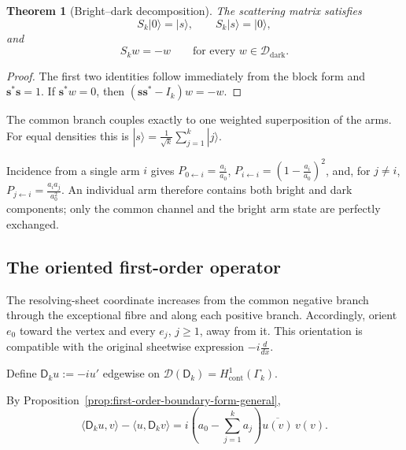 \documentclass[11pt]{article}
\theoremstyle{plain}
\newtheorem{theorem}{Theorem}[section]
\theoremstyle{definition}
\begin{document}
\begin{theorem}[Bright--dark decomposition]
\label{thm:Bk-bright-dark}
The scattering matrix satisfies
\[
  S_k|0\rangle=|s\rangle,
  \qquad
  S_k|s\rangle=|0\rangle,
\]
and
\[
  S_kw=-w
  \qquad
  \text{for every }
  w\in\mathcal D_{\mathrm{dark}}.
\]
\end{theorem}

\begin{proof}
The first two identities follow immediately from the block form and
\(\mathbf s^*\mathbf s=1\). If
\(\mathbf s^*w=0\),
then
\((\mathbf s\mathbf s^*-I_k)w=-w\).
\end{proof}

The common branch couples exactly to one weighted superposition of the
arms. For equal densities this is
\(|s\rangle = \frac1{\sqrt{k}} \sum_{j=1}^{k}|j\rangle\).

Incidence from a single arm \(i\) gives
\(P_{0\leftarrow i} = \frac{a_i}{a_0}\),
\(P_{i\leftarrow i} = \left( 1-\frac{a_i}{a_0} \right)^2\),
and, for \(j\neq i\),
\(P_{j\leftarrow i} = \frac{a_ia_j}{a_0^2}\).
An individual arm therefore contains both bright and dark components; only
the common channel and the bright arm state are perfectly exchanged.

\subsection{The oriented first-order operator}
\label{subsec:Bk-first-order}
\label{subsec:Bk-first-order-adjoint}
\label{subsec:Bk-deficiency}
\label{subsec:Bk-punctured-derivative}
\label{subsec:Bk-comparison}
\label{subsec:Bk-interpretation}

The resolving-sheet coordinate increases from the common negative branch
through the exceptional fibre and along each positive branch. Accordingly,
orient \(e_0\) toward the vertex and every \(e_j\), \(j\geq1\), away from
it. This orientation is compatible with the original sheetwise expression
\(-i\frac{d}{dx}\).

Define \(\mathsf D_k u := -iu'\) edgewise on
\(\mathcal D(\mathsf D_k) = H^1_{\mathrm{cont}}(\Gamma_k)\).

By Proposition~\ref{prop:first-order-boundary-form-general},
\[
  \langle\mathsf D_ku,v\rangle
  -
  \langle u,\mathsf D_kv\rangle
  =
  i
  \left(
    a_0-\sum_{j=1}^{k}a_j
  \right)
  \overline{u(v)}\,v(v).
\]
\end{document}
